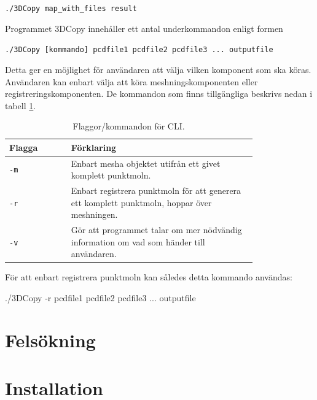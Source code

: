 \documentclass[a4paper,titlepage,12pt]{article}
\begin{document}
		\texttt{./3DCopy map\_with\_files result}
		
		Programmet 3DCopy innehåller ett antal underkommandon enligt formen
		
		\texttt{./3DCopy [kommando] pcdfile1 pcdfile2 pcdfile3 ... outputfile}
		
		Detta ger en möjlighet för användaren att välja vilken komponent som ska köras. Användaren kan enbart välja att köra meshningskomponenten eller registreringskomponenten. De kommandon som finns tillgängliga beskrivs nedan i tabell \ref{tab:flaggor_cli}.
		
		\begin{table}[h!]
			\centering
			\caption{Flaggor/kommandon för CLI.}
			\label{tab:flaggor_cli}
			
			\begin{tabular}{p{0.2\linewidth}p{0.6\linewidth}}
				Flagga & Förklaring \\
				\hline
				\texttt{-m} & Enbart mesha objektet utifrån ett givet komplett punktmoln. \\
				\hline
				\texttt{-r} & Enbart registrera punktmoln för att generera ett komplett punktmoln, hoppar över meshningen. \\
				\hline
				\texttt{-v} & Gör att programmet talar om mer nödvändig information om vad som händer till användaren. \\
				\hline
			\end{tabular}
		\end{table}	
		
		För att enbart registrera punktmoln kan således detta kommando användas:
		
		./3DCopy -r pcdfile1 pcdfile2 pcdfile3 ... outputfile
\newpage  
    
\section{Felsökning}
\newpage
    
\section{Installation}
\newpage
\end{document}
